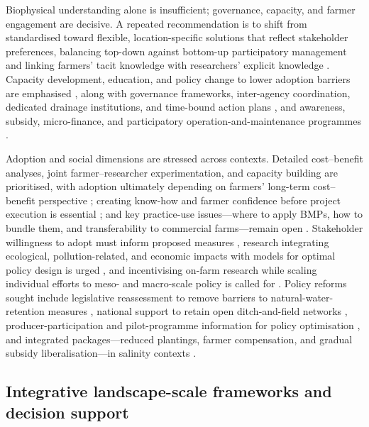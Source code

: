 Biophysical understanding alone is insufficient; governance, capacity, and
farmer engagement are decisive. A repeated recommendation is to shift from
standardised toward flexible, location-specific solutions that reflect
stakeholder preferences, balancing top-down against bottom-up participatory
management and linking farmers' tacit knowledge with researchers' explicit
knowledge \parencite{Ritzema2011,Ritzema2016,Ritzema2023}. Capacity development,
education, and policy change to lower adoption barriers are emphasised
\parencite{Castellano2019,SHIRMOHAMMADI1995,Kesicka2023b}, along with governance
frameworks, inter-agency coordination, dedicated drainage institutions, and
time-bound action plans
\parencite{Singh2019c,Qureshi2008,Gopalakrishnan2007,Ritzema2008b,Valipour2014,Quinn2009},
and awareness, subsidy, micro-finance, and participatory
operation-and-maintenance programmes
\parencite{Satyanarayana2007,Manjunatha2004,BenAissa2013,MCFARLANE1992}.

Adoption and social dimensions are stressed across contexts. Detailed
cost--benefit analyses, joint farmer--researcher experimentation, and capacity
building are prioritised, with adoption ultimately depending on farmers'
long-term cost--benefit perspective \parencite{Okwany2016}; creating know-how and
farmer confidence before project execution is essential \parencite{Ghumman2011};
and key practice-use issues---where to apply BMPs, how to bundle them, and
transferability to commercial farms---remain open \parencite{Ward2018}.
Stakeholder willingness to adopt must inform proposed measures
\parencite{Cuevas2019}, research integrating ecological, pollution-related, and
economic impacts with models for optimal policy design is urged
\parencite{Saikkonen2014}, and incentivising on-farm research while scaling
individual efforts to meso- and macro-scale policy is called for
\parencite{David2015}. Policy reforms sought include legislative reassessment to
remove barriers to natural-water-retention measures \parencite{Kvítek2023},
national support to retain open ditch-and-field networks \parencite{Marja2013},
producer-participation and pilot-programme information for policy optimisation
\parencite{Malone2023}, and integrated packages---reduced plantings, farmer
compensation, and gradual subsidy liberalisation---in salinity contexts
\parencite{Kotb2000}.

\subsection{Integrative landscape-scale frameworks and decision support}

